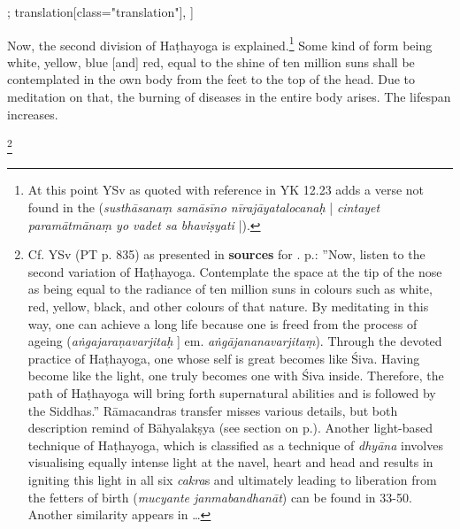 \begin{alignment}[
  texts=edition[class="edition"];
  translation[class="translation"],
  ]
\begin{translation}
\begin{tlate}[p19_01]
      \end{tlate}
\label{secondhathatrans}
      \begin{tlate}[p20_01]
        \indent Now, the second division of Haṭhayoga is explained.\footnote{At this point YSv as quoted with reference in YK 12.23 adds a verse not found in the  (\textit{susthāsanaṃ samāsīno nīrajāyatalocanaḥ} | \textit{cintayet paramātmānaṃ yo vadet sa bhaviṣyati} |).} Some kind of form being white, yellow, blue [and] red, equal to the shine of ten million suns shall be contemplated in the own body from the feet to the top of the head. Due to meditation on that, the burning of diseases in the entire body arises. The lifespan increases.\begin{buber}[f20_1]\footnote{Cf. YSv (PT p. 835) as presented in \textbf{sources} for . p.\pageref{hathayoga}: ''Now, listen to the second variation of Haṭhayoga. Contemplate the space at the tip of the nose as being equal to the radiance of ten million suns in colours such as white, red, yellow, black, and other colours of that nature. By meditating in this way, one can achieve a long life because one is freed from the process of ageing (\textit{aṅgajaraṇavarjitaḥ} ] em. \textit{aṅgājananavarjitaṃ}). Through the devoted practice of Haṭhayoga, one whose self is great becomes like Śiva. Having become like the light, one truly becomes one with Śiva inside. Therefore, the path of Haṭhayoga will bring forth supernatural abilities and is followed by the Siddhas.'' Rāmacandras transfer misses various details, but both description remind of Bāhyalakṣya (see section  on p.\pageref{bahya}). Another light-based technique of Haṭhayoga, which is classified as a technique of \textit{dhyāna} involves visualising equally intense light at the navel, heart and head and results in igniting this light in all six \textit{cakra}s and ultimately leading to liberation from the fetters of birth (\textit{mucyante janmabandhanāt}) can be found in  33-50. Another similarity appears in \ldots}\end{buber}
        \end{tlate}
      \end{translation}
    \end{alignment}
    \pagebreak %
